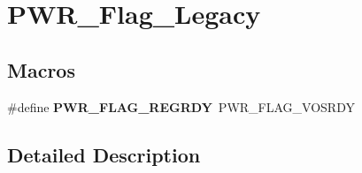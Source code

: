 \hypertarget{group___p_w_r___flag___legacy}{}\section{P\+W\+R\+\_\+\+Flag\+\_\+\+Legacy}
\label{group___p_w_r___flag___legacy}
\subsection*{Macros}
\begin{DoxyCompactItemize}
\item 
\hypertarget{group___p_w_r___flag___legacy_ga1ada28e60d553d036ebfabdd5566f52b}{}\#define {\bfseries P\+W\+R\+\_\+\+F\+L\+A\+G\+\_\+\+R\+E\+G\+R\+D\+Y}~P\+W\+R\+\_\+\+F\+L\+A\+G\+\_\+\+V\+O\+S\+R\+D\+Y\label{group___p_w_r___flag___legacy_ga1ada28e60d553d036ebfabdd5566f52b}

\end{DoxyCompactItemize}


\subsection{Detailed Description}
